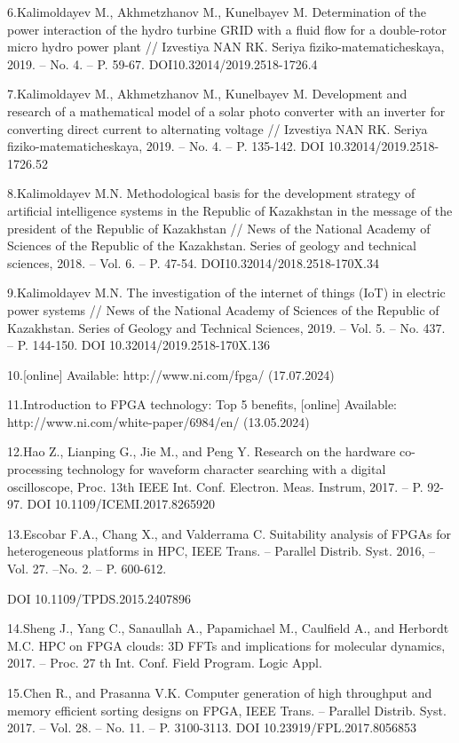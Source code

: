 6.Kalimoldayev M., Akhmetzhanov M., Kunelbayev M. Determination of the
power interaction of the hydro turbine GRID with a fluid flow for a
double-rotor micro hydro power plant // Izvestiya NAN RK. Seriya
fiziko-matematicheskaya, 2019. -- No. 4. -- P. 59-67.
DOI10.32014/2019.2518-1726.4

7.Kalimoldayev M., Akhmetzhanov M., Kunelbayev M. Development and
research of a mathematical model of a solar photo converter with an
inverter for converting direct current to alternating voltage //
Izvestiya NAN RK. Seriya fiziko-matematicheskaya, 2019. -- No. 4. -- P.
135-142. DOI 10.32014/2019.2518-1726.52

8.Kalimoldayev M.N. Methodological basis for the development strategy of
artificial intelligence systems in the Republic of Kazakhstan in the
message of the president of the Republic of Kazakhstan // News of the
National Academy of Sciences of the Republic of the Kazakhstan. Series
of geology and technical sciences, 2018. -- Vol. 6. -- P. 47-54.
DOI10.32014/2018.2518-170X.34

9.Kalimoldayev M.N. The investigation of the internet of things (IoT) in
electric power systems // News of the National Academy of Sciences of
the Republic of Kazakhstan. Series of Geology and Technical Sciences,
2019. -- Vol. 5. -- No. 437. -- P. 144-150. DOI
10.32014/2019.2518-170X.136

10.{[}online{]} Available: http://www.ni.com/fpga/ (17.07.2024)

11.Introduction to FPGA technology: Top 5 benefits, {[}online{]}
Available: http://www.ni.com/white-paper/6984/en/ (13.05.2024)

12.Hao Z., Lianping G., Jie M., and Peng Y. Research on the hardware
co-processing technology for waveform character searching with a digital
oscilloscope, Proc. 13th IEEE Int. Conf. Electron. Meas. Instrum, 2017.
-- P. 92-97. DOI 10.1109/ICEMI.2017.8265920

13.Escobar F.A., Chang X., and Valderrama C. Suitability analysis of
FPGAs for heterogeneous platforms in HPC, IEEE Trans. -- Parallel
Distrib. Syst. 2016, -- Vol. 27. --No. 2. -- P. 600-612.

DOI 10.1109/TPDS.2015.2407896

14.Sheng J., Yang C., Sanaullah A., Papamichael M., Caulfield A., and
Herbordt M.C. HPC on FPGA clouds: 3D FFTs and implications for molecular
dynamics, 2017. -- Proc. 27 th Int. Conf. Field Program. Logic Appl.

15.Chen R., and Prasanna V.K. Computer generation of high throughput and
memory efficient sorting designs on FPGA, IEEE Trans. -- Parallel
Distrib. Syst. 2017. -- Vol. 28. -- No. 11. -- P. 3100-3113. DOI
10.23919/FPL.2017.8056853

